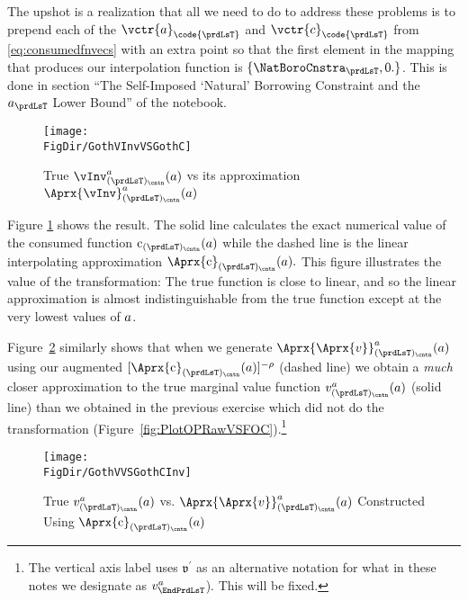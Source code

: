 The upshot is a realization that all we need to do to address these problems is to prepend each of the $\vctr{a}_{\code{\prdLsT}}$ and $\vctr{c}_{\code{\prdLsT}}$ from \eqref{eq:consumedfnvecs} with an extra point so that the first element in the mapping that produces our interpolation function is $\{\NatBoroCnstra_{\prdLsT},0.\}$. This is done in section ``The Self-Imposed `Natural' Borrowing Constraint and the $a_{\prdLsT}$ Lower Bound'' of the notebook.%


\hypertarget{GothVInvVSGothC}{}
\begin{figure}
  \centerline{\texttt{[image: \\FigDir/GothVInvVSGothC]}}
  \caption{True $\vInv^{{a}}_{({\prdLsT})_\cntn}(\aNrm)$ vs its approximation $\Aprx{\vInv}^{{a}}_{({\prdLsT})_\cntn}(\aNrm)$}
  \label{fig:GothVInvVSGothC}
\end{figure}

Figure \ref{fig:GothVInvVSGothC} shows the result. The solid line calculates the exact numerical value of the consumed function $\cFunc_{({\prdLsT})_\cntn}(\aNrm)$ while the dashed line is the linear interpolating approximation $\Aprx{\cFunc}_{({\prdLsT})_\cntn}(\aNrm).$ This figure illustrates the value of the transformation: The true function is close to linear, and so the linear approximation is almost indistinguishable from the true function except at the very lowest values of $a$.

Figure~\ref{fig:GothVVSGothCInv} similarly shows that when we generate $\Aprx{\Aprx{\vFunc}}_{({\prdLsT})_\cntn}^{{a}}({a})$ using our augmented $[\Aprx{\cFunc}_{({\prdLsT})_\cntn}({a})]^{-\CRRA}$ (dashed line) we obtain a \textit{much} closer approximation to the true marginal value function $\vFunc^{{a}}_{({\prdLsT})_\cntn}({a})$ (solid line) than we obtained in the previous exercise which did not do the transformation (Figure~\ref{fig:PlotOPRawVSFOC}).\footnote{The vertical axis label uses $\mathfrak{v}^{\prime}$ as an alternative notation for what in these notes we designate as $\vFunc^{a}_{\EndPrdLsT}$).  This will be fixed.}

\hypertarget{GothVVSGothCInv}{}
\begin{figure}
  \centerline{\texttt{[image: \\FigDir/GothVVSGothCInv]}}
  \caption{True $\vFunc^{{a}}_{({\prdLsT})_\cntn}(\aNrm)$ vs. $\Aprx{\Aprx{\vFunc}}_{({\prdLsT})_\cntn}^{{a}}(\aNrm)$ Constructed Using $\Aprx{\cFunc}_{({\prdLsT})_\cntn}(\aNrm)$}
  \label{fig:GothVVSGothCInv}
\end{figure}

